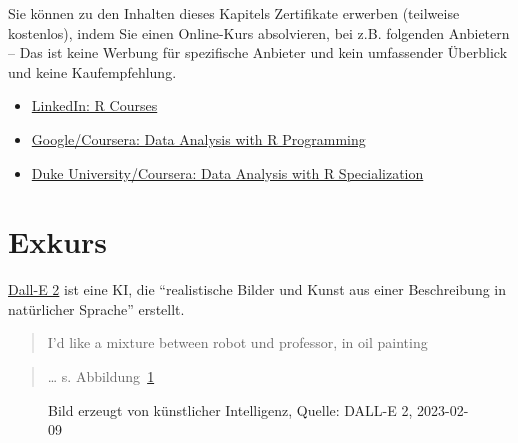 \documentclass[
  letterpaper,
]{scrbook}
\providecommand{\tightlist}{%
  \setlength{\itemsep}{0pt}\setlength{\parskip}{0pt}}\usepackage{longtable,booktabs,array}
\theoremstyle{definition}
\theoremstyle{definition}
\theoremstyle{definition}
\theoremstyle{remark}
\begin{document}
Sie können zu den Inhalten dieses Kapitels Zertifikate erwerben
(teilweise kostenlos), indem Sie einen Online-Kurs absolvieren, bei z.B.
folgenden Anbietern -- Das ist keine Werbung für spezifische Anbieter
und kein umfassender Überblick und keine Kaufempfehlung.

\begin{itemize}
\tightlist
\item
  \href{https://www.linkedin.com/learning/search?keywords=R}{LinkedIn: R
  Courses}
\item
  \href{https://www.coursera.org/learn/data-analysis-r\#modules}{Google/Coursera:
  Data Analysis with R Programming}
\item
  \href{https://www.coursera.org/specializations/statistics}{Duke
  University/Coursera: Data Analysis with R Specialization}
\end{itemize}

\section{Exkurs}\label{exkurs}

\href{https://openai.com/dall-e-2/}{Dall-E 2} ist eine KI, die
``realistische Bilder und Kunst aus einer Beschreibung in natürlicher
Sprache'' erstellt.

\begin{quote}
{} I'd like a mixture between robot und professor, in oil
painting
\end{quote}

\begin{quote}
{} \ldots{} s. Abbildung~\ref{fig-mix-rob-prof}
\end{quote}

\begin{figure}


\caption{\label{fig-mix-rob-prof}Bild erzeugt von künstlicher
Intelligenz, Quelle: DALL-E 2, 2023-02-09}

\end{figure}%
\end{document}
